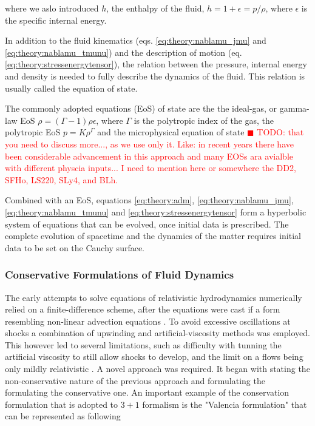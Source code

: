 \documentclass[11pt,a4paper,headinclude=true,DIV=14,BCOR=8mm,chapterprefix,listof=totoc,twoside,openright,abstracton]{scrbook}
\newcommand{\todo}[1]{\textcolor{red}{$\blacksquare$ TODO: #1}}
\begin{document}
where we aslo introduced $h$, the enthalpy of the fluid, $h = 1 + \epsilon = p/\rho$, where $\epsilon$ is the specific internal energy. 

In addition to the fluid kinematics (eqs. \ref{eq:theory:nablamu_jmu} and \ref{eq:theory:nablamu_tmunu}) and the description of motion (eq. \ref{eq:theory:stressenergytensor}), the relation between the pressure, internal energy and density is needed to fully describe the dynamics of the fluid. This relation is usually called the equation of state. 

The commonly adopted equations (EoS) of state are the the ideal-gas, or gamma-law EoS $\rho = (\Gamma-1)\rho\epsilon$, where $\Gamma$ is the polytropic index of the gas, the polytropic EoS $p = K\rho^{\Gamma}$ and the microphysical equation of state \todo{that you need to discuss more..., as we use only it. Like: in recent years there have been considerable advancement in this approach and many EOSs ara avialble with different physcia inputs... I need to mention here or somewhere the DD2, SFHo, LS220, SLy4, and BLh.}

Combined with an EoS, equations \ref{eq:theory:adm}, \ref{eq:theory:nablamu_jmu}, \ref{eq:theory:nablamu_tmunu} and \ref{eq:theory:stressenergytensor} form a hyperbolic
system of equations that can be evolved, once initial data is prescribed. The complete evolution of spacetime and the dynamics of the matter requires initial data to be set on the Cauchy surface.


\subsubsection{Conservative Formulations of Fluid Dynamics}

The early attempts to solve equations of relativistic hydrodynamics numerically relied on a finite-difference scheme, after the equations were cast if a form resembling non-linear advection equations \cite{May:1966,Wilson:1972}. To avoid excessive oscillations at shocks a combination of upwinding and artificial-viscosity methods was employed. This however led to several limitations, such as difficulty with tunning the artificial viscosity to still allow shocks to develop, and the limit on a flows being only mildly relativistic \cite{Font:2008fka}. A novel approach was required. It began with stating the non-conservative nature of the previous approach and formulating the formulating the conservative one. An important example of the conservation formulation that is adopted to $3 + 1$ formalism is the "Valencia formulation" \cite{Banyuls:1997} that can be represented as following
\end{document}
